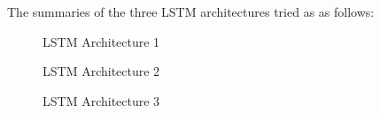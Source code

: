  The summaries of the three LSTM architectures tried as as follows:
 
 \begin{figure}
%
  \caption{LSTM Architecture 1}
  \label{fig:key}
\end{figure}

\begin{figure}
%
  \caption{LSTM Architecture 2}
  \label{fig:key}
\end{figure}

\begin{figure}
%
  \caption{LSTM Architecture 3}
  \label{fig:key}
\end{figure}
 
